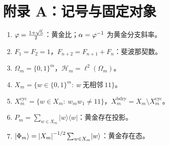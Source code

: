 \section{附录 A：记号与固定对象}

\begin{enumerate}
  \item $\varphi=\frac{1+\sqrt5}{2}$：黄金比；$\alpha=\varphi^{-1}$ 为黄金分支斜率。
  \item $F_1=F_2=1$，$F_{n+2}=F_{n+1}+F_n$：斐波那契数。
  \item $\Omega_m=\{0,1\}^m$，$\mathcal H_m=\ell^2(\Omega_m)$。
  \item $X_m=\{w\in\{0,1\}^m:\ w\ \text{无相邻}\ 11\}$。
  \item $X_m^{\mathrm{cyc}}=\{w\in X_m:\ w_mw_1\neq 11\}$，$X_m^{\mathrm{bdry}}=X_m\setminus X_m^{\mathrm{cyc}}$。
  \item $P_m=\sum_{w\in X_m}\lvert w\rangle\langle w\rvert$：黄金存在投影。
  \item $\lvert\Phi_m\rangle=\left\lvert X_m\right\rvert^{-1/2}\sum_{w\in X_m}\lvert w\rangle$：黄金存在态。
\end{enumerate}

